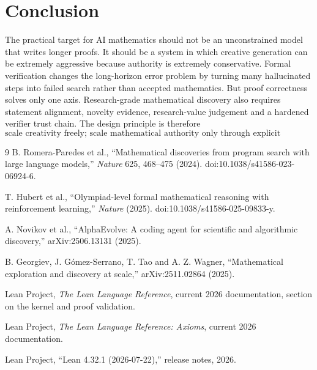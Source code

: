 \documentclass[11pt]{article}
\begin{document}
\section{Conclusion}

The practical target for AI mathematics should not be an unconstrained model that writes longer proofs. It should be a system in which creative generation can be extremely aggressive because authority is extremely conservative. Formal verification changes the long-horizon error problem by turning many hallucinated steps into failed search rather than accepted mathematics. But proof correctness solves only one axis. Research-grade mathematical discovery also requires statement alignment, novelty evidence, research-value judgement and a hardened verifier trust chain. The design principle is therefore
\[
\boxed{\text{scale creativity freely; scale mathematical authority only through explicit assurance.}}
\]

\begin{thebibliography}{9}
B. Romera-Paredes et al., ``Mathematical discoveries from program search with large language models,'' \emph{Nature} 625, 468--475 (2024). doi:10.1038/s41586-023-06924-6.

T. Hubert et al., ``Olympiad-level formal mathematical reasoning with reinforcement learning,'' \emph{Nature} (2025). doi:10.1038/s41586-025-09833-y.

A. Novikov et al., ``AlphaEvolve: A coding agent for scientific and algorithmic discovery,'' arXiv:2506.13131 (2025).

B. Georgiev, J. G\'omez-Serrano, T. Tao and A. Z. Wagner, ``Mathematical exploration and discovery at scale,'' arXiv:2511.02864 (2025).

Lean Project, \emph{The Lean Language Reference}, current 2026 documentation, section on the kernel and proof validation.

Lean Project, \emph{The Lean Language Reference: Axioms}, current 2026 documentation.

Lean Project, ``Lean 4.32.1 (2026-07-22),'' release notes, 2026.
\end{thebibliography}
\end{document}
